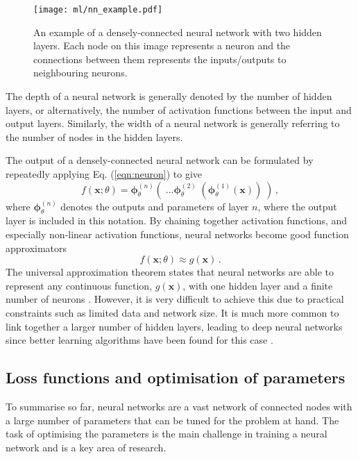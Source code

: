 \documentclass[main.tex]{subfiles}
\begin{document}
    \begin{figure}
        \texttt{[image: ml/nn\_example.pdf]}
        \caption{An example of a densely-connected
        neural network with two hidden layers.
        Each node on this image represents
        a neuron and the connections between them
        represents the inputs/outputs to neighbouring neurons.}
        \label{fig:nn_example}
    \end{figure}

    The depth of a neural network
    is generally denoted by the number of hidden layers,
    or alternatively, the number of activation functions
    between the input and output layers. Similarly,
    the width of a neural network is generally referring
    to the number of nodes in the hidden layers.

    The output of a densely-connected neural network can
    be formulated by repeatedly applying Eq. (\ref{eqn:neuron})
    to give
    \begin{equation}\label{eqn:nn_output}
        f(\mathbf{x}; \theta) = \boldsymbol{\phi}^{(n)}_{\theta}(\; \ldots \boldsymbol{\phi}^{(2)}_{\theta}\; (\boldsymbol{\phi}^{(1)}_{\theta}(\mathbf{x}) ) \; ) \, ,
    \end{equation}
    where $\boldsymbol{\phi}^{(n)}_{\theta}$
    denotes the outputs and parameters of layer $n$,
    where the output layer is included in this notation.
    By chaining together activation functions, and especially
    non-linear activation functions, neural networks
    become good function approximators
    \begin{equation}\label{eqn:nn_approx}
        f(\mathbf{x}; \theta) \approx g(\mathbf{x}) \, .
    \end{equation}
    The universal approximation theorem states that neural networks are
    able to represent any continuous function, $g(\mathbf{x})$,
    with one hidden layer and a finite number of neurons \cite{HORNIK1991251}.
    However, it is very difficult to achieve this due to
    practical constraints such as limited data and network size.
    It is much more common to link
    together a larger number of hidden layers, leading
    to deep neural networks since better learning algorithms
    have been found for this case \cite{lu2017expressive}.
    
\subsection{Loss functions and optimisation of parameters}
    To summarise so far, neural networks are a vast network
    of connected nodes with a large number of parameters that
    can be tuned for the problem at hand.
    The task of optimising the parameters is the main challenge
    in training a neural network and is a key area of research.
\end{document}
